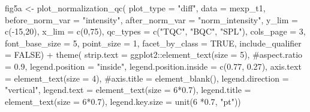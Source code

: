 \documentclass[
  letterpaper,
  DIV=11,
  numbers=noendperiod]{scrartcl}
\newenvironment{Shaded}{\begin{snugshade}}{\end{snugshade}}
\newcommand{\AttributeTok}[1]{\textcolor[rgb]{0.40,0.45,0.13}{#1}}
\newcommand{\CommentTok}[1]{\textcolor[rgb]{0.37,0.37,0.37}{#1}}
\newcommand{\ConstantTok}[1]{\textcolor[rgb]{0.56,0.35,0.01}{#1}}
\newcommand{\DecValTok}[1]{\textcolor[rgb]{0.68,0.00,0.00}{#1}}
\newcommand{\FloatTok}[1]{\textcolor[rgb]{0.68,0.00,0.00}{#1}}
\newcommand{\FunctionTok}[1]{\textcolor[rgb]{0.28,0.35,0.67}{#1}}
\newcommand{\NormalTok}[1]{\textcolor[rgb]{0.00,0.23,0.31}{#1}}
\newcommand{\OtherTok}[1]{\textcolor[rgb]{0.00,0.23,0.31}{#1}}
\newcommand{\SpecialCharTok}[1]{\textcolor[rgb]{0.37,0.37,0.37}{#1}}
\newcommand{\StringTok}[1]{\textcolor[rgb]{0.13,0.47,0.30}{#1}}
\begin{document}
\begin{Shaded}
\begin{Highlighting}[]
\NormalTok{fig5a }\OtherTok{\textless{}{-}} \FunctionTok{plot\_normalization\_qc}\NormalTok{(}
  \AttributeTok{plot\_type =} \StringTok{"diff"}\NormalTok{,}
  \AttributeTok{data =}\NormalTok{ mexp\_t1,}
  \AttributeTok{before\_norm\_var =} \StringTok{"intensity"}\NormalTok{,}
  \AttributeTok{after\_norm\_var =} \StringTok{"norm\_intensity"}\NormalTok{,}
  \AttributeTok{y\_lim =} \FunctionTok{c}\NormalTok{(}\SpecialCharTok{{-}}\DecValTok{15}\NormalTok{,}\DecValTok{20}\NormalTok{), }
  \AttributeTok{x\_lim =} \FunctionTok{c}\NormalTok{(}\DecValTok{0}\NormalTok{,}\DecValTok{75}\NormalTok{),}
  \AttributeTok{qc\_types =} \FunctionTok{c}\NormalTok{(}\StringTok{"TQC"}\NormalTok{, }\StringTok{"BQC"}\NormalTok{, }\StringTok{"SPL"}\NormalTok{),}
  \AttributeTok{cols\_page =} \DecValTok{3}\NormalTok{,}
  \AttributeTok{font\_base\_size =} \DecValTok{5}\NormalTok{,}
  \AttributeTok{point\_size =} \DecValTok{1}\NormalTok{,}
  \AttributeTok{facet\_by\_class =} \ConstantTok{TRUE}\NormalTok{,}
  \AttributeTok{include\_qualifier =} \ConstantTok{FALSE}\NormalTok{) }\SpecialCharTok{+} 
    \FunctionTok{theme}\NormalTok{(}
      \AttributeTok{strip.text =}\NormalTok{ ggplot2}\SpecialCharTok{::}\FunctionTok{element\_text}\NormalTok{(}\AttributeTok{size =} \DecValTok{5}\NormalTok{),}
      \CommentTok{\#aspect.ratio = 0.9,}
      \AttributeTok{legend.position =} \StringTok{"inside"}\NormalTok{,}
      \AttributeTok{legend.position.inside =} \FunctionTok{c}\NormalTok{(}\FloatTok{0.77}\NormalTok{, }\FloatTok{0.27}\NormalTok{),}
      \AttributeTok{axis.text =} \FunctionTok{element\_text}\NormalTok{(}\AttributeTok{size =} \DecValTok{4}\NormalTok{),}
      \CommentTok{\#axis.title = element\_blank(),}
      \AttributeTok{legend.direction =} \StringTok{"vertical"}\NormalTok{, }
      \AttributeTok{legend.text =} \FunctionTok{element\_text}\NormalTok{(}\AttributeTok{size =} \DecValTok{6}\SpecialCharTok{*}\FloatTok{0.7}\NormalTok{), }
      \AttributeTok{legend.title =} \FunctionTok{element\_text}\NormalTok{(}\AttributeTok{size =} \DecValTok{6}\SpecialCharTok{*}\FloatTok{0.7}\NormalTok{),}
      \AttributeTok{legend.key.size =} \FunctionTok{unit}\NormalTok{(}\DecValTok{6} \SpecialCharTok{*}\FloatTok{0.7}\NormalTok{, }\StringTok{"pt"}\NormalTok{)) }


\end{Highlighting}
\end{Shaded}
\end{document}
